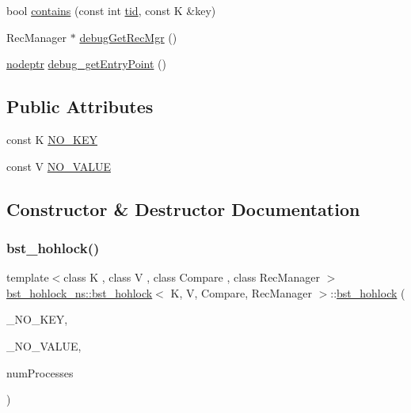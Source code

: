 \begin{DoxyCompactItemize}
\item 
bool \hyperlink{classbst__hohlock__ns_1_1bst__hohlock_a433df8bf5bede3cd7742479958138cc5}{contains} (const int \hyperlink{microbench_2main_8cpp_a9ca9869868fe7e7a38a921cc7de4103f}{tid}, const K \&key)
\item 
Rec\+Manager $\ast$ \hyperlink{classbst__hohlock__ns_1_1bst__hohlock_af92c09e1d46b07ba45e6efd202637bad}{debug\+Get\+Rec\+Mgr} ()
\item 
\hyperlink{bst__rwlock__impl_8h_a04158d2a20768fe447133ff555823b05}{nodeptr} \hyperlink{classbst__hohlock__ns_1_1bst__hohlock_a796fb5841aeebb3fb1927b0de4a86e5c}{debug\+\_\+get\+Entry\+Point} ()
\end{DoxyCompactItemize}
\subsection*{Public Attributes}
\begin{DoxyCompactItemize}
\item 
const K \hyperlink{classbst__hohlock__ns_1_1bst__hohlock_a6197b46d1d114130bce12e6db712c88f}{N\+O\+\_\+\+K\+EY}
\item 
const V \hyperlink{classbst__hohlock__ns_1_1bst__hohlock_afec4f903fbecace7935e53e614982b20}{N\+O\+\_\+\+V\+A\+L\+UE}
\end{DoxyCompactItemize}


\subsection{Constructor \& Destructor Documentation}
\mbox{\label{classbst__hohlock__ns_1_1bst__hohlock_a33b94cc439dbbc725a7a659f48c5be91}} 
\subsubsection{\texorpdfstring{bst\+\_\+hohlock()}{bst\_hohlock()}}
{\footnotesize\ttfamily template$<$class K , class V , class Compare , class Rec\+Manager $>$ \\
\hyperlink{classbst__hohlock__ns_1_1bst__hohlock}{bst\+\_\+hohlock\+\_\+ns\+::bst\+\_\+hohlock}$<$ K, V, Compare, Rec\+Manager $>$\+::\hyperlink{classbst__hohlock__ns_1_1bst__hohlock}{bst\+\_\+hohlock} (\begin{DoxyParamCaption}\item[{const K}]{\+\_\+\+N\+O\+\_\+\+K\+EY,  }\item[{const V}]{\+\_\+\+N\+O\+\_\+\+V\+A\+L\+UE,  }\item[{const int}]{num\+Processes }\end{DoxyParamCaption})\hspace{0.3cm}{\ttfamily [inline]}}

